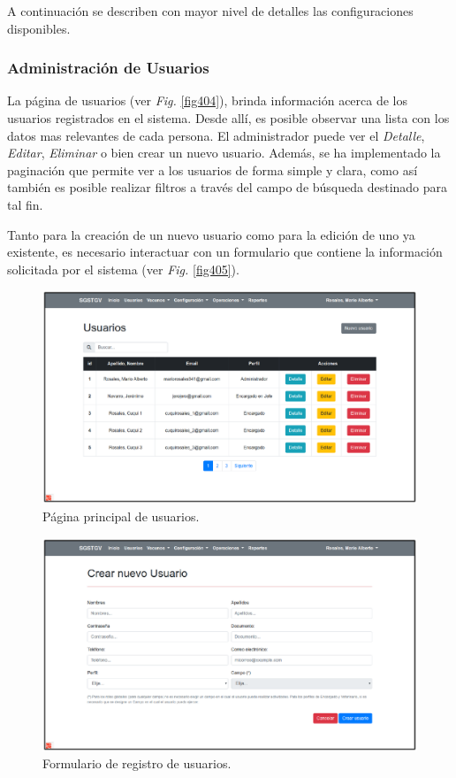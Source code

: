 \documentclass[11pt,oneside]{book}
\begin{document}
A continuación se describen con mayor nivel de detalles las configuraciones disponibles.

\subsubsection{Administración de Usuarios}
La página de usuarios (ver \textit{Fig.} \eqref{fig404}), brinda información acerca de los usuarios registrados en el sistema. Desde allí, es posible observar una lista con los datos mas relevantes de cada persona. El administrador puede ver el \textit{Detalle}, \textit{Editar}, \textit{Eliminar} o bien crear un nuevo usuario. Además, se ha implementado la paginación que permite ver a los usuarios de forma simple y clara, como así también es posible realizar filtros a través del campo de búsqueda destinado para tal fin.

Tanto para la creación de un nuevo usuario como para la edición de uno ya existente, es necesario interactuar con un formulario que contiene la información solicitada por el sistema (ver \textit{Fig.} \eqref{fig405}).

\begin{figure}[tbhp]
\centerline{\includegraphics[scale=0.87]{figs/capitulo_4_desarrollo/fig404.pdf}}
\caption{Página principal de usuarios.}
\label{fig404}
\end{figure}

\begin{figure}[tbhp]
\centerline{\includegraphics[scale=0.87]{figs/capitulo_4_desarrollo/fig405.pdf}}
\caption{Formulario de registro de usuarios.}
\label{fig405}
\end{figure}
\end{document}
